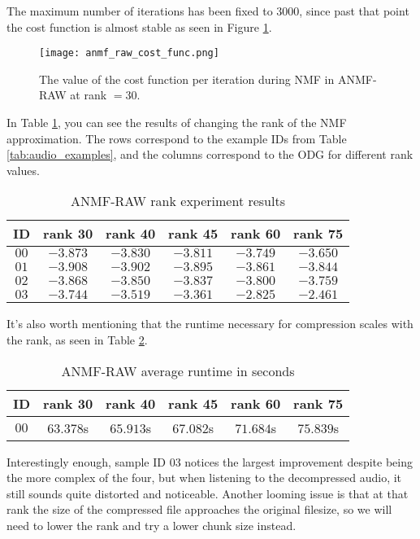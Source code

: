 The maximum number of iterations has been fixed to 3000, since past that point the cost function is almost stable as seen in Figure \ref{fig:anmf_raw_cost_func}.

\begin{figure}[ht]
	\caption[ANMF-RAW cost function]{The value of the cost function per iteration during NMF in ANMF-RAW at rank $= 30$.}
	\label{fig:anmf_raw_cost_func}
	\centering
	\texttt{[image: anmf\_raw\_cost\_func.png]}
\end{figure}

In Table \ref{tab:anmf_raw_rank}, you can see the results of changing the rank of the NMF approximation. The rows correspond to the example IDs from Table \ref{tab:audio_examples}, and the columns correspond to the ODG for different rank values.

\begin{table}[htbp]\caption{ANMF-RAW rank experiment results}
	\label{tab:anmf_raw_rank}
	\centering
	\begin{tabular}{|c|c|c|c|c|c|}
		\hline
		ID & rank 30 & rank 40 & rank 45 & rank 60 & rank 75 \\ \hline
		$00$ & $-3.873$ & $-3.830$ & $-3.811$ & $-3.749$ & $-3.650$ \\
		$01$ & $-3.908$ & $-3.902$ & $-3.895$ & $-3.861$ & $-3.844$ \\
		$02$ & $-3.868$ & $-3.850$ & $-3.837$ & $-3.800$ & $-3.759$ \\
		$03$ & $-3.744$ & $-3.519$ & $-3.361$ & $-2.825$ & $-2.461$ \\		
		\hline
	\end{tabular}
\end{table}

It's also worth mentioning that the runtime necessary for compression scales with the rank, as seen in Table \ref{tab:anmf_raw_runtime}.

\begin{table}[htbp]\caption{ANMF-RAW average runtime in seconds}
	\label{tab:anmf_raw_runtime}
	\centering
	\begin{tabular}{|c|c|c|c|c|c|}
		\hline
		ID & rank 30 & rank 40 & rank 45 & rank 60 & rank 75 \\ \hline
		$00$ & $63.378$s & $65.913$s & $67.082$s & $71.684$s & $75.839$s \\	
		\hline
	\end{tabular}
\end{table}

Interestingly enough, sample ID 03 notices the largest improvement despite being the more complex of the four, but when listening to the decompressed audio, it still sounds quite distorted and noticeable. Another looming issue is that at that rank the size of the compressed file approaches the original filesize, so we will need to lower the rank and try a lower chunk size instead.

